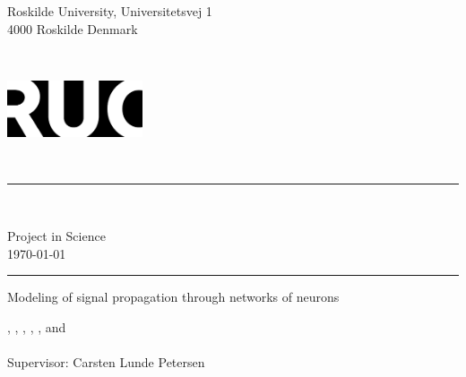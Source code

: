 

\begin{titlepage}
    {\selectfont %



        \noindent
        \begin{minipage}{.45\textwidth}
            \begin{flushleft}
                Roskilde University, Universitetsvej 1\\ 4000 Roskilde Denmark
            \end{flushleft}
        \end{minipage}%
        ~
        \begin{minipage}{.5\textwidth}
            \begin{flushright}
                \includegraphics[width=4cm]{Pictures/RUCLOGO.png}
            \end{flushright}
        \end{minipage}\\

        \noindent\rule{\linewidth}{0.4mm}\\
        \begin{center}
            Project in Science\\
            \today
        \end{center}
        \rule{\linewidth}{0.4mm}


        \begin{flushleft}
            \noindent
            \Huge Modeling of signal propagation through networks of neurons
            \huge 
        \end{flushleft}

        \noindent
        ,     
        ,         
        , 
        ,  
        , and \\      
        \\ 
        Supervisor: Carsten Lunde Petersen  

        \begin{figure}[H]
            \centering
        \end{figure}

    }
\end{titlepage}

